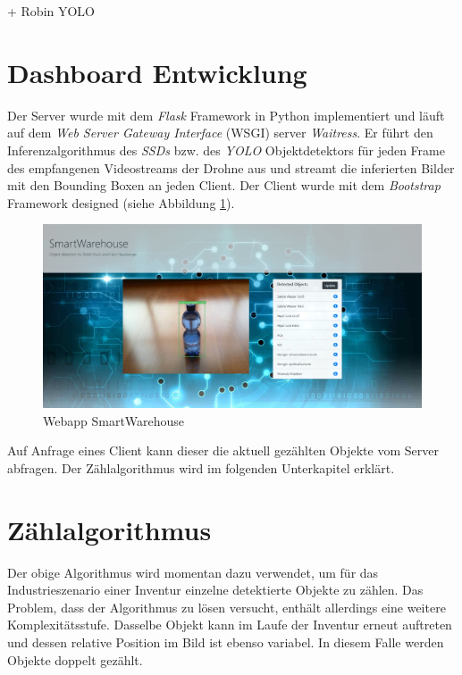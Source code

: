 + Robin YOLO

\section{Dashboard Entwicklung}

Der Server wurde mit dem \textit{Flask} Framework in Python implementiert und läuft auf dem \textit{Web Server Gateway Interface} (WSGI) server \textit{Waitress}. Er führt den Inferenzalgorithmus des \textit{SSDs} bzw. des \textit{YOLO} Objektdetektors für jeden Frame des empfangenen Videostreams der Drohne aus und streamt die inferierten Bilder mit den Bounding Boxen an jeden Client. Der Client wurde mit dem \textit{Bootstrap} Framework designed (siehe Abbildung \ref{webapp}).

\begin{figure}[ht]
	\begin{center}
		\includegraphics[width=15cm]{Bilder/webapp.jpeg} 
		\caption[Webapp SmartWarehouse]{Webapp SmartWarehouse}
		\label{webapp}
	\end{center}
\end{figure}

Auf Anfrage eines Client kann dieser die aktuell gezählten Objekte vom Server abfragen. Der Zählalgorithmus wird im folgenden Unterkapitel erklärt. 

\section{Zählalgorithmus}



Der obige Algorithmus wird momentan dazu verwendet, um für das Industrieszenario einer Inventur einzelne detektierte Objekte zu zählen. Das Problem, dass der Algorithmus zu lösen versucht, enthält allerdings eine weitere Komplexitätsstufe. Dasselbe Objekt kann im Laufe der Inventur erneut auftreten und dessen relative Position im Bild ist ebenso variabel. In diesem Falle werden Objekte doppelt gezählt. 
